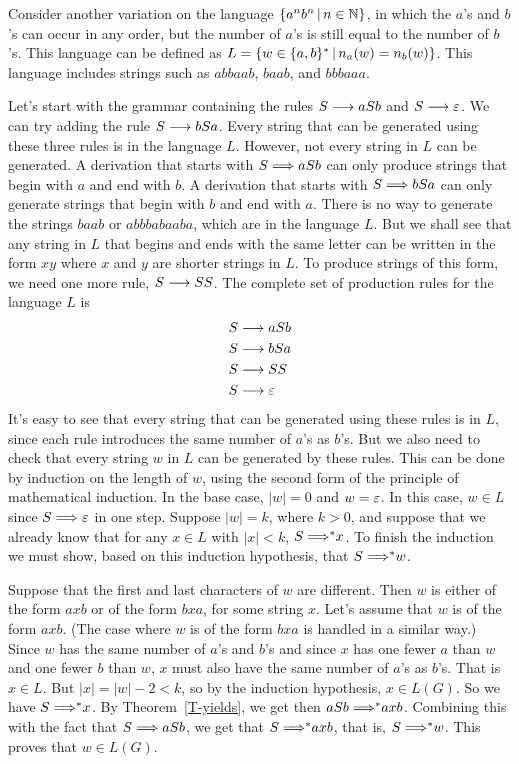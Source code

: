 \medbreak

Consider another variation on the language $\{a^nb^n\,|\, n\in{\mathbb N}\}$,
in which the $a$'s and $b$'s can occur in any order, but the number
of $a$'s is still equal to the number of $b$'s.  This language
can be defined as
$L=\{w\in\{a,b\}^*\,|\, n_a(w) = n_b(w)\}$.  This language includes
strings such as $abbaab$, $baab$, and $bbbaaa$.

Let's start with the grammar containing the rules $S\longrightarrow aSb$
and $S\longrightarrow\varepsilon$.  We can try adding the rule
$S\longrightarrow bSa$.  Every string that can be generated using these
three rules is in the language $L$.  However, not every string
in $L$ can be generated.  A derivation that starts with $S\Longrightarrow aSb$
can only produce strings that begin with $a$ and end with $b$.
A derivation that starts with $S\Longrightarrow bSa$ can only generate strings
that begin with $b$ and end with $a$.  There is no way to generate
the strings $baab$ or $abbbabaaba$, which are in the language $L$.
But we shall see that any string in $L$ that begins and
ends with the same letter can be written in the form $xy$ where
$x$ and $y$ are shorter strings in $L$.  To produce strings of
this form, we need one more rule, $S\longrightarrow SS$.  The complete set of
production rules for the language $L$ is
\begin{align*}
    S&\longrightarrow aSb\\
    S&\longrightarrow bSa\\
    S&\longrightarrow SS\\
    S&\longrightarrow \varepsilon
\end{align*}
It's easy to see that every string that can be generated using these
rules is in $L$, since each rule introduces the same number of
$a$'s as $b$'s.  But we also need to check that every string
$w$ in $L$ can be generated by these rules.  This can be done
by induction on the length of $w$, using the second form
of the principle of mathematical induction.  In the base case,
$|w|=0$ and $w=\varepsilon$.  In this case, $w\in L$ since
$S\Longrightarrow\varepsilon$ in one step.
Suppose $|w|=k$, where $k>0$, and suppose that
we already know that for any $x\in L$ with $|x|<k$, $S\;{\Longrightarrow}^* x$.
To finish the induction we must show, based on this induction 
hypothesis, that $S\;{\Longrightarrow}^* w$.

Suppose that the first and last characters of $w$ are
different.  Then $w$ is either of the form $axb$ or of the form $bxa$,
for some string $x$.  Let's assume that $w$ is of the form $axb$.
(The case where $w$ is of the form $bxa$ is handled in a similar way.)
Since $w$ has the same number of $a$'s and $b$'s
and since $x$ has one fewer $a$ than $w$ and one fewer $b$ than $w$,
$x$ must also have the same number of $a$'s as $b$'s.  That is $x\in L$.
But $|x|=|w|-2<k$, so by the induction hypothesis, $x\in L(G)$.
So we have $S\;{\Longrightarrow}^* x$.  By Theorem~\ref{T-yields}, we
get then $aSb\;{\Longrightarrow}^* axb$.  Combining this with the fact
that $S\Longrightarrow aSb$, we get that $S\;{\Longrightarrow}^* axb$, that is,
$S\;{\Longrightarrow}^* w$.  This proves that $w\in L(G)$.

